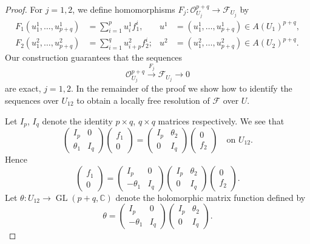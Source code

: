 \begin{proof}
For $j=1,2$, we define homomorphisms $F_j:\mathcal O_{U_j}^{p+q}\to\mathcal F_{U_j}$ by
\begin{align*}
F_1(u_1^1,\ldots,u_{p+q}^1)&=\sum_{i=1}^p u_i^1f_1^i, &u^1&=(u_1^1,\ldots,u_{p+q}^1)\in A(U_1)^{p+q},\\
F_2(u_1^2,\ldots,u_{p+q}^2)&=\sum_{i=1}^q u_{i+p}^2f_2^i; &u^2&=(u_1^2,\ldots,u_{p+q}^2)\in A(U_2)^{p+q}.
\end{align*}
Our construction guarantees that the sequences
\[
\mathcal O_{U_j}^{p+q}\xrightarrow{F_j}\mathcal F_{U_j}\to0
\]
are exact, $j=1,2$. In the remainder of the proof we show how to identify the sequences over $U_{12}$ to obtain a locally free resolution of $\mathcal F$ over $U$.

Let $I_p$, $I_q$ denote the identity $p\times q$, $q\times q$ matrices respectively. We see that
\[
\begin{pmatrix}I_p&0\\\theta_1&I_q\end{pmatrix}\begin{pmatrix}f_1\\0\end{pmatrix}
=\begin{pmatrix}I_p&\theta_2\\0&I_q\end{pmatrix}\begin{pmatrix}0\\f_2\end{pmatrix}\quad\text{on }U_{12}.
\]
Hence
\[
\begin{pmatrix}f_1\\0\end{pmatrix}
=\begin{pmatrix}I_p&0\\-\theta_1&I_q\end{pmatrix}\begin{pmatrix}I_p&\theta_2\\0&I_q\end{pmatrix}\begin{pmatrix}0\\f_2\end{pmatrix}.
\]
Let $\theta:U_{12}\to\operatorname{GL}(p+q,\mathbb C)$ denote the holomorphic matrix function defined by
\[
\theta=\begin{pmatrix}I_p&0\\-\theta_1&I_q\end{pmatrix}\begin{pmatrix}I_p&\theta_2\\0&I_q\end{pmatrix}.
\]
\end{proof}
